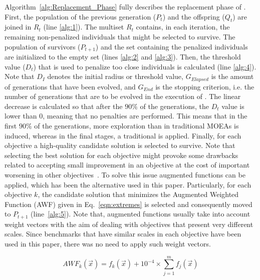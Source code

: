 Algorithm~\ref{alg:Replacement_Phase} fully describes the replacement phase of \VSDMOEA{}.
%
First, the population of the previous generation ($P_t$) and the offspring ($Q_t$) are joined
in $R_t$ (line \ref{alg:1}).
%
The multiset $R_t$ contains, in each iteration, the remaining non-penalized individuals that might be selected 
to survive.
%
The population of survivors ($P_{t+1}$) and the set containing the penalized individuals are initialized to
the empty set (lines \ref{alg:2} and \ref{alg:3}).
%
Then, the threshold value ($D_t$) that is used to penalize too close individuals is calculated (line \ref{alg:4}).
%
Note that $D_I$ denotes the initial radius or threshold value, $G_{Elapsed}$ is the amount of generations that have 
been evolved, and $G_{End}$ is the stopping criterion, i.e. the number of generations that are to be evolved 
in the execution of \VSDMOEA{}.
%
The linear decrease is calculated so that after the $90\%$ of the generations, the $D_t$ value is lower than 0, 
meaning that no penalties are performed.
%
This means that in the first $90\%$ of the generations, more exploration than in traditional MOEAs is induced, 
whereas in the final stages, a traditional \MOEA{} is applied.
%
Finally, for each objective a high-quality candidate solution is selected to survive.
%
Note that selecting the best solution for each objective might provoke some drawbacks related to accepting small improvement
in an objective at the cost of important worsening in other objectives~\cite{deb2016optimality}.
%
To solve this issue augmented functions can be applied, which has been the alternative used in this paper.
%
Particularly, for each objective $k$, the candidate solution that minimizes the Augmented Weighted Function (AWF)
given in Eq.~\ref{eqn:extremes} is selected and consequently moved to $P_{t+1}$ (line~\ref{alg:5}).
%
Note that, augmented functions usually take into account weight vectors with the aim of dealing with objectives
that present very different scales.
%
Since benchmarks that have similar scales in each objective have been used in this paper, there was no need to apply
such weight vectors.

\begin{equation}\label{eqn:extremes}
AWF_k (\vec{x}) = f_k(\vec{x}) + 10^{-4} \times  \sum_{j=1}^m f_j( \vec{x} )
\end{equation}


